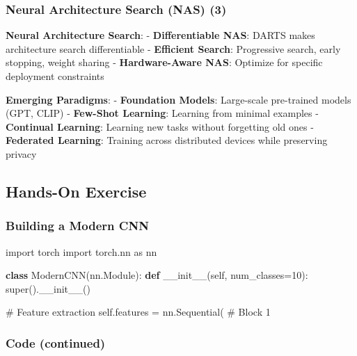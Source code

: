 \documentclass[
]{article}
\newenvironment{Shaded}{\begin{snugshade}}{\end{snugshade}}
\newcommand{\BuiltInTok}[1]{\textcolor[rgb]{0.00,0.23,0.31}{#1}}
\newcommand{\CommentTok}[1]{\textcolor[rgb]{0.37,0.37,0.37}{#1}}
\newcommand{\DecValTok}[1]{\textcolor[rgb]{0.68,0.00,0.00}{#1}}
\newcommand{\FunctionTok}[1]{\textcolor[rgb]{0.28,0.35,0.67}{#1}}
\newcommand{\ImportTok}[1]{\textcolor[rgb]{0.00,0.46,0.62}{#1}}
\newcommand{\KeywordTok}[1]{\textcolor[rgb]{0.00,0.23,0.31}{\textbf{#1}}}
\newcommand{\NormalTok}[1]{\textcolor[rgb]{0.00,0.23,0.31}{#1}}
\newcommand{\OperatorTok}[1]{\textcolor[rgb]{0.37,0.37,0.37}{#1}}
\newcommand{\VariableTok}[1]{\textcolor[rgb]{0.07,0.07,0.07}{#1}}
\begin{document}
\subsubsection{Neural Architecture Search (NAS)
(3)}\label{neural-architecture-search-nas-3}

\textbf{Neural Architecture Search}: - \textbf{Differentiable NAS}:
DARTS makes architecture search differentiable - \textbf{Efficient
Search}: Progressive search, early stopping, weight sharing -
\textbf{Hardware-Aware NAS}: Optimize for specific deployment
constraints

\textbf{Emerging Paradigms}: - \textbf{Foundation Models}: Large-scale
pre-trained models (GPT, CLIP) - \textbf{Few-Shot Learning}: Learning
from minimal examples - \textbf{Continual Learning}: Learning new tasks
without forgetting old ones - \textbf{Federated Learning}: Training
across distributed devices while preserving privacy

\subsection{Hands-On Exercise}\label{hands-on-exercise}

\subsubsection{Building a Modern CNN}\label{building-a-modern-cnn}

\begin{Shaded}
\begin{Highlighting}[]
\ImportTok{import}\NormalTok{ torch}
\ImportTok{import}\NormalTok{ torch.nn }\ImportTok{as}\NormalTok{ nn}

\KeywordTok{class}\NormalTok{ ModernCNN(nn.Module):}
    \KeywordTok{def} \FunctionTok{\_\_init\_\_}\NormalTok{(}\VariableTok{self}\NormalTok{, num\_classes}\OperatorTok{=}\DecValTok{10}\NormalTok{):}
        \BuiltInTok{super}\NormalTok{().}\FunctionTok{\_\_init\_\_}\NormalTok{()}
        
        \CommentTok{\# Feature extraction}
        \VariableTok{self}\NormalTok{.features }\OperatorTok{=}\NormalTok{ nn.Sequential(}
            \CommentTok{\# Block 1}
\end{Highlighting}
\end{Shaded}

\subsubsection{Code (continued)}\label{code-continued-3}
\end{document}
